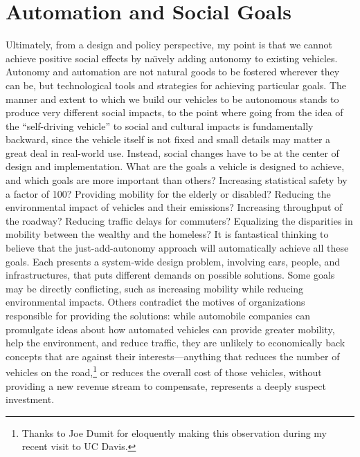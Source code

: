 
\section{Automation and Social Goals}

Ultimately, from a design and policy perspective, my point is that we
cannot achieve positive social effects by na\"{\i}vely adding autonomy to
existing vehicles. Autonomy and automation are not natural goods to be
fostered wherever they can be, but technological tools and strategies
for achieving particular goals. The manner and extent to which we
build our vehicles to be autonomous stands to produce very different
social impacts, to the point where going from the idea of the
``self-driving vehicle'' to social and cultural impacts is
fundamentally backward, since the vehicle itself is not fixed and
small details may matter a great deal in real-world use. Instead,
social changes have to be at the center of design and implementation.
What are the goals a vehicle is designed to achieve, and which goals
are more important than others? Increasing
statistical safety by a factor of 100? Providing mobility for the
elderly or disabled? Reducing the environmental impact of vehicles and
their emissions? Increasing throughput of the roadway? Reducing
traffic delays for commuters? Equalizing the 
disparities in mobility between the wealthy and the homeless? It is
fantastical thinking to believe that the just-add-autonomy approach
will automatically achieve all these goals. Each presents a
system-wide design problem, involving cars, people, and
infrastructures, that puts different demands on possible
solutions. Some goals may be directly conflicting, such as increasing
mobility while reducing 
environmental impacts.
Others contradict the motives of organizations responsible for
providing the solutions:  while automobile companies can promulgate
ideas about how automated vehicles can provide greater mobility, help
the environment, and reduce traffic, they are unlikely to economically
back concepts that are against their interests---anything that reduces
the number of vehicles on the road,\footnote{Thanks to Joe Dumit for eloquently
  making this observation during my recent visit to UC Davis.}
or reduces the overall cost of those 
vehicles, without providing a new revenue stream to compensate,
represents a deeply suspect investment. 

